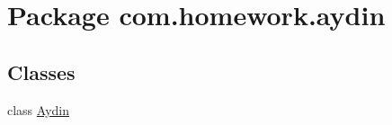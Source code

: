 \hypertarget{namespacecom_1_1homework_1_1aydin}{}\section{Package com.\+homework.\+aydin}
\label{namespacecom_1_1homework_1_1aydin}
\subsection*{Classes}
\begin{DoxyCompactItemize}
\item 
class \hyperlink{classcom_1_1homework_1_1aydin_1_1_aydin}{Aydin}
\end{DoxyCompactItemize}
